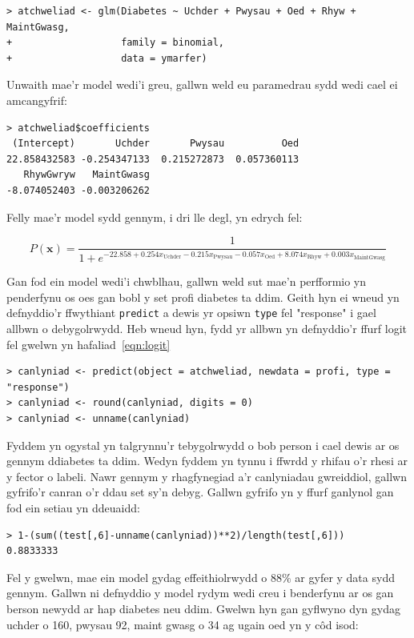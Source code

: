 \begin{verbatim}
> atchweliad <- glm(Diabetes ~ Uchder + Pwysau + Oed + Rhyw + MaintGwasg,
+                   family = binomial,
+                   data = ymarfer)
\end{verbatim}

Unwaith mae'r model wedi'i greu, gallwn weld eu paramedrau sydd wedi cael ei amcangyfrif:

\begin{verbatim}
> atchweliad$coefficients
 (Intercept)       Uchder       Pwysau          Oed 
22.858432583 -0.254347133  0.215272873  0.057360113 
   RhywGwryw   MaintGwasg 
-8.074052403 -0.003206262 
\end{verbatim}

Felly mae'r model sydd gennym, i dri lle degl, yn edrych fel:

$$ P(\mathbf{x}) = \frac{1}{1 + e^{-22.858 + 0.254 x_{\text{Uchder}} - 0.215 x_{\text{Pwysau}} - 0.057 x_{\text{Oed}} + 8.074 x_{\text{Rhyw}} + 0.003 x_{\text{MaintGwasg}}}} $$

Gan fod ein model wedi'i chwblhau, gallwn weld sut mae'n perfformio yn penderfynu os oes gan bobl y set profi diabetes ta ddim. Geith hyn ei wneud yn defnyddio'r ffwythiant \texttt{predict} a dewis yr opsiwn \texttt{type} fel "response" i gael allbwn o debygolrwydd. Heb wneud hyn, fydd yr allbwn yn defnyddio'r ffurf logit fel gwelwn yn hafaliad~\ref{eqn:logit} %

\begin{verbatim}
> canlyniad <- predict(object = atchweliad, newdata = profi, type = "response")
> canlyniad <- round(canlyniad, digits = 0)
> canlyniad <- unname(canlyniad)
\end{verbatim}

Fyddem yn ogystal yn talgrynnu'r tebygolrwydd o bob person i cael dewis ar os gennym ddiabetes ta ddim. Wedyn fyddem yn tynnu i ffwrdd y rhifau o'r rhesi ar y fector o labeli. Nawr gennym y rhagfynegiad a'r canlyniadau gwreiddiol, gallwn gyfrifo'r canran o'r ddau set sy'n debyg. Gallwn gyfrifo yn y ffurf ganlynol gan fod ein setiau yn ddeuaidd:

\begin{verbatim}
> 1-(sum((test[,6]-unname(canlyniad))**2)/length(test[,6]))
0.8833333
\end{verbatim}

Fel y gwelwn, mae ein model gydag effeithiolrwydd o $88\%$ ar gyfer y data sydd gennym. Gallwn ni defnyddio y model rydym wedi creu i benderfynu ar os gan berson newydd ar hap diabetes neu ddim. Gwelwn hyn gan gyflwyno dyn gydag uchder o 160, pwysau 92, maint gwasg o 34 ag ugain oed yn y c\^{o}d isod: 

